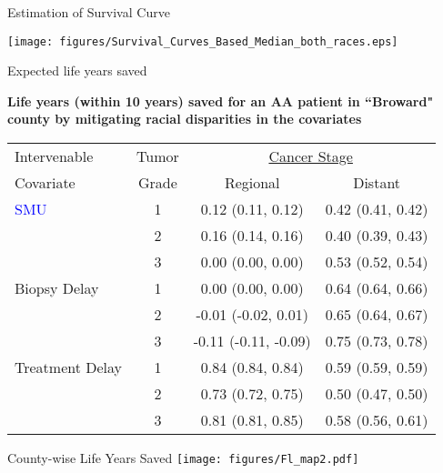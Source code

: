 \documentclass{beamer}
\begin{document}
\begin{frame}{Estimation of Survival Curve}
\protect\hypertarget{estimation-of-survival-function}{}
\begin{center}\texttt{[image: figures/Survival\_Curves\_Based\_Median\_both\_races.eps]} \end{center}

\end{frame}
\begin{frame}{Expected life years saved}

\protect\hypertarget{results}{}



\textbf{Life years (within 10 years) saved for an AA patient in ``Broward" county by mitigating racial disparities in the covariates}
\begin{table}
\centering

\begin{tabular}{l|c|c|c} 
\toprule
Intervenable & Tumor & \multicolumn{2}{c}{\underline{Cancer Stage}} \\

Covariate & Grade & Regional  & Distant \\
\midrule
\textcolor{blue}{SMU} & 1 &0.12 (0.11, 0.12) & 0.42 (0.41, 0.42) \\
& 2 & 0.16 (0.14, 0.16) & 0.40 (0.39, 0.43) \\
& 3 & 0.00 (0.00, 0.00) & 0.53 (0.52, 0.54) \\
\midrule
Biopsy Delay & 1 & 0.00 (0.00, 0.00) & 0.64 (0.64, 0.66) \\
& 2 & -0.01 (-0.02, 0.01) &0.65 (0.64, 0.67) \\
& 3 & -0.11 (-0.11, -0.09) & 0.75 (0.73, 0.78) \\
\midrule
Treatment Delay & 1 &0.84 (0.84, 0.84) & 0.59 (0.59, 0.59) \\
& 2 & 0.73 (0.72, 0.75) & 0.50 (0.47, 0.50)\\
& 3 & 0.81 (0.81, 0.85) & 0.58 (0.56, 0.61) \\
\bottomrule
\end{tabular}
\end{table}
\end{frame}



\begin{frame}{County-wise Life Years Saved}
\texttt{[image: figures/Fl\_map2.pdf]}
    
\end{frame}
\end{document}
